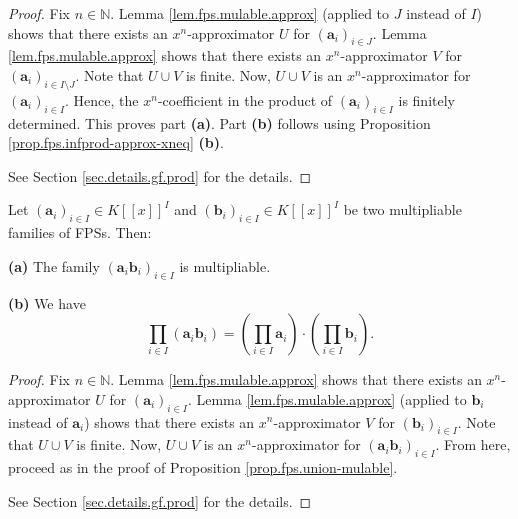 \begin{proof}
Fix $n\in\mathbb{N}$. Lemma \ref{lem.fps.mulable.approx} (applied to $J$
instead of $I$) shows that there exists an $x^{n}$-approximator $U$ for
$\left(\mathbf{a}_{i}\right)_{i\in J}$. Lemma \ref{lem.fps.mulable.approx}
shows that there exists an $x^{n}$-approximator $V$ for
$\left(\mathbf{a}_{i}\right)_{i\in I\setminus J}$. Note that $U\cup V$ is
finite. Now, $U\cup V$ is an $x^{n}$-approximator for
$\left(\mathbf{a}_{i}\right)_{i\in I}$. Hence, the $x^{n}$-coefficient in the
product of $\left(\mathbf{a}_{i}\right)_{i\in I}$ is finitely determined. This
proves part \textbf{(a)}. Part \textbf{(b)} follows using Proposition
\ref{prop.fps.infprod-approx-xneq} \textbf{(b)}.

See Section \ref{sec.details.gf.prod} for the details.
\end{proof}

\begin{proposition}
\label{prop.fps.prod-mulable}
\leantarget
\leanok
Let $\left(\mathbf{a}_{i}\right)_{i\in I}\in K\left[\left[x\right]\right]^{I}$
and $\left(\mathbf{b}_{i}\right)_{i\in I}\in K\left[\left[x\right]\right]^{I}$
be two multipliable families of FPSs. Then:

\textbf{(a)} The family $\left(\mathbf{a}_{i}\mathbf{b}_{i}\right)_{i\in I}$ is
multipliable.

\textbf{(b)} We have
\[
\prod_{i\in I}\left(\mathbf{a}_{i}\mathbf{b}_{i}\right)=\left(\prod_{i\in I}
\mathbf{a}_{i}\right)\cdot\left(\prod_{i\in I}\mathbf{b}_{i}\right).
\]
\end{proposition}

\begin{proof}
Fix $n\in\mathbb{N}$. Lemma \ref{lem.fps.mulable.approx} shows that there
exists an $x^{n}$-approximator $U$ for $\left(\mathbf{a}_{i}\right)_{i\in I}$.
Lemma \ref{lem.fps.mulable.approx} (applied to $\mathbf{b}_{i}$ instead of
$\mathbf{a}_{i}$) shows that there exists an $x^{n}$-approximator $V$ for
$\left(\mathbf{b}_{i}\right)_{i\in I}$. Note that $U\cup V$ is finite. Now,
$U\cup V$ is an $x^{n}$-approximator for
$\left(\mathbf{a}_{i}\mathbf{b}_{i}\right)_{i\in I}$. From here, proceed as
in the proof of Proposition \ref{prop.fps.union-mulable}.

See Section \ref{sec.details.gf.prod} for the details.
\end{proof}

